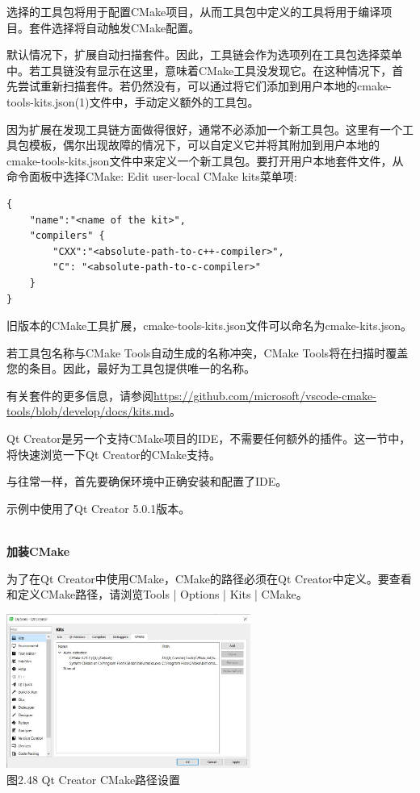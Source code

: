 选择的工具包将用于配置CMake项目，从而工具包中定义的工具将用于编译项目。套件选择将自动触发CMake配置。

默认情况下，扩展自动扫描套件。因此，工具链会作为选项列在工具包选择菜单中。若工具链没有显示在这里，意味着CMake工具没发现它。在这种情况下，首先尝试重新扫描套件。若仍然没有，可以通过将它们添加到用户本地的cmake-tools-kits.json(1)文件中，手动定义额外的工具包。

因为扩展在发现工具链方面做得很好，通常不必添加一个新工具包。这里有一个工具包模板，偶尔出现故障的情况下，可以自定义它并将其附加到用户本地的cmake-tools-kits.json文件中来定义一个新工具包。要打开用户本地套件文件，从命令面板中选择CMake: Edit user-local CMake kits菜单项:

\begin{lstlisting}[style=styleCMake]
{
	"name":"<name of the kit>",
	"compilers" {
		"CXX":"<absolute-path-to-c++-compiler>",
		"C": "<absolute-path-to-c-compiler>"
	}
}
\end{lstlisting}

\begin{tcolorbox}[colback=webgreen!5!white,colframe=webgreen!75!black,title=Note]
旧版本的CMake工具扩展，cmake-tools-kits.json文件可以命名为cmake-kits.json。
\end{tcolorbox}

若工具包名称与CMake Tools自动生成的名称冲突，CMake Tools将在扫描时覆盖您的条目。因此，最好为工具包提供唯一的名称。

有关套件的更多信息，请参阅\url{https://github.com/microsoft/vscode-cmake-tools/blob/develop/docs/kits.md}。


Qt Creator是另一个支持CMake项目的IDE，不需要任何额外的插件。这一节中，将快速浏览一下Qt Creator的CMake支持。

与往常一样，首先要确保环境中正确安装和配置了IDE。

示例中使用了Qt Creator 5.0.1版本。

\hspace*{\fill} \\ %
\noindent
\textbf{加装CMake}

为了在Qt Creator中使用CMake，CMake的路径必须在Qt Creator中定义。要查看和定义CMake路径，请浏览Tools | Options | Kits | CMake。

\begin{center}
\includegraphics[width=0.6\textwidth]{content/1/chapter2/images/48.jpg}\\
图2.48 Qt Creator CMake路径设置
\end{center}

